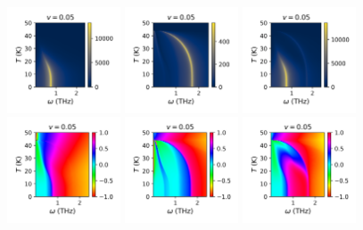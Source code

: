 \documentclass[a4paper]{article}
\begin{document}
\begin{figure}[H]
  \centering
  \includegraphics[width=0.3\textwidth]{v2-g1_abs.png}
  \includegraphics[width=0.3\textwidth]{v2-g2_abs.png}
  \includegraphics[width=0.3\textwidth]{v2-g3_abs.png}
  \includegraphics[width=0.3\textwidth]{v2-g1_phase.png}
  \includegraphics[width=0.3\textwidth]{v2-g2_phase.png}
  \includegraphics[width=0.3\textwidth]{v2-g3_phase.png}
\end{figure}
\end{document}
